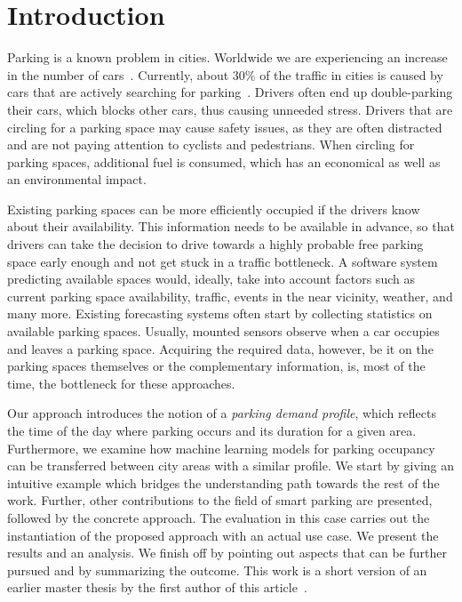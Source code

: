 \section{Introduction}
Parking is a known problem in cities.
Worldwide we are experiencing an increase in the number of cars~\cite{car_increase}.
Currently, about 30\% of the traffic in cities is caused by cars that are actively searching for parking~\cite{traffic_congestion}.
Drivers often end up double-parking their cars, which blocks other cars, thus causing unneeded stress.
Drivers that are circling for a parking space may cause safety issues, as they are often distracted and are not paying attention to cyclists and pedestrians.
When circling for parking spaces, additional fuel is consumed, which has an economical as well as an environmental impact.

Existing parking spaces can be more efficiently occupied if the drivers know about their availability.
This information needs to be available in advance, so that drivers can take the decision to drive towards a highly probable free parking space early enough and not get stuck in a traffic bottleneck.
A software system predicting available spaces would, ideally, take into account factors such as current parking space availability, traffic, events in the near vicinity, weather, and many more.
Existing forecasting systems often start by collecting statistics on available parking spaces.
Usually, mounted sensors observe when a car occupies and leaves a parking space.
Acquiring the required data, however, be it on the parking spaces themselves or the complementary information, is, most of the time, the bottleneck for these approaches. 

Our approach introduces the notion of a \textit{parking demand profile}, which reflects the time of the day where parking occurs and its duration for a given area.
Furthermore, we examine how machine learning models for parking occupancy can be transferred between city areas with a similar profile.
We start by giving an intuitive example which bridges the understanding path towards the rest of the work.
Further, other contributions to the field of smart parking are presented, followed by the concrete approach.
The evaluation in this case carries out the instantiation of the proposed approach with an actual use case. We present the results and an analysis.
We finish off by pointing out aspects that can be further pursued and by summarizing the outcome.
This work is a short version of an earlier master thesis by the first author of this article~\cite{ionita2017master}.

